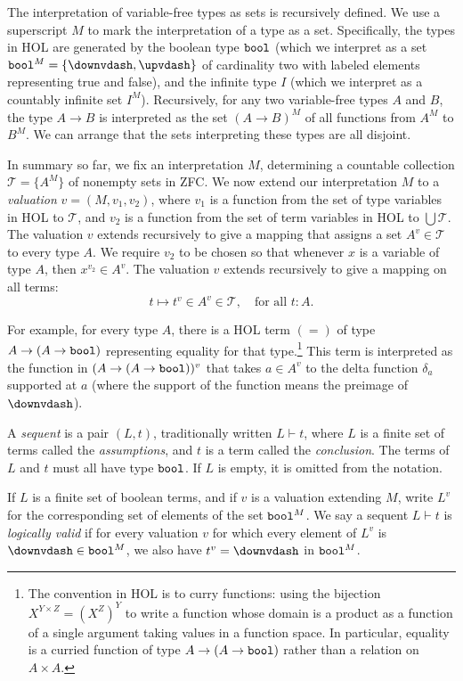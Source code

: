 \documentclass[brochure,english,12pt]{bourbaki}
\theoremstyle{plain}
\def\op#1{{\operatorname{#1}}}
\def\bool{\op{\tt bool}}
\def\T{{\mathcal T}}
\begin{document}
The interpretation
of variable-free types as sets is recursively defined.  We use a superscript $M$ to mark the interpretation
of a type as a set.  Specifically, the types in HOL are generated by
the boolean type $\bool$ (which we interpret as a set $\bool^M=\{\downvdash ,\upvdash \}$ 
of cardinality two with labeled elements representing true and false), and
the infinite type $I$ (which we interpret as a countably infinite set $I^M$).
 Recursively, for any two variable-free types $A$ and $B$, the type $A\to B$ is interpreted
as the set $(A\to B)^M$ of all functions from $A^M$ to $B^M$.
We can arrange that the sets interpreting these types are all disjoint.

In summary so far,
we fix an interpretation $M$, determining a countable collection $\T =\{A^M\}$ of nonempty sets in 
ZFC.  
We now extend our interpretation $M$ to a {\it valuation} $v=(M,v_1,v_2)$, where $v_1$ is a function
from the set of type variables in HOL to $\T$, and $v_2$ is a function from the set of term
variables in HOL to $\bigcup\T$.
The valuation $v$ extends recursively to give a mapping that assigns
a set $A^{v}\in \T$ to every type $A$.  We require $v_2$ to be chosen so that whenever $x$ is a variable of type $A$,
then $x^{v_2} \in A^v$.  The valuation $v$ extends recursively to give a mapping on all terms:
\[
t\mapsto t^v \in A^v \in \T, \quad \text{for all } t:A.
\]

For example,
for every type $A$,
there is a HOL term $(=)$ of type $A\to (A\to \bool)$ 
representing equality for that type.\footnote{The convention in HOL is to curry functions: using the bijection
$X^{Y \times Z} = (X^Z)^Y$ to write a function whose domain is a product as a function
of a single argument taking values in a function space. In particular, 
equality is a curried function of type $A\to (A \to\bool)$
rather than a relation on $A\times A$.}
This term is interpreted
as the function in $(A\to (A\to\bool))^v$ that
takes $a\in A^{v}$ to the delta function $\delta_a$ supported at $a$
(where the support of the function means 
the preimage of $\downvdash$).


A {\it sequent} is a pair $(L,t)$, traditionally written $L\vdash t$, where $L$ is a finite set of terms
called the {\it assumptions}, and $t$ is a term called the {\it conclusion}.  The
terms of $L$ and $t$ must all have type $\bool$.   If $L$ is empty, it is omitted from the
notation.  

If $L$ is a finite set of boolean terms, and if $v$ is a valuation extending $M$,  
write $L^{v}$ for the corresponding set of elements of the set $\bool^M$.
We say a sequent $L \vdash t$ is {\it logically valid}
if for every valuation $v$ for which every element of $L^{v}$ is $\downvdash \in \bool^M$, we also have
$t^{v}=\downvdash $ in $\bool^M$.
\end{document}
